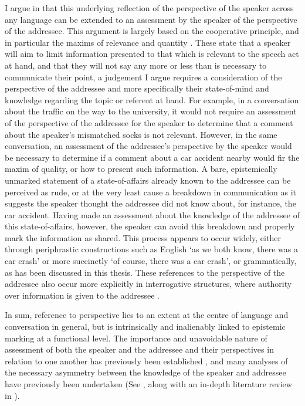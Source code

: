 I argue in  that this underlying reflection of the perspective of the speaker across any language can be extended to an assessment by the speaker of the perspective of the addressee. This argument is largely based on the cooperative principle, and in particular the maxims of relevance and quantity \cite{Grice1989}. These state that a speaker will aim to limit information presented to that which is relevant to the speech act at hand, and that they will not say any more or less than is necessary to communicate their point, a judgement I argue requires a consideration of the perspective of the addressee and more specifically their state-of-mind and knowledge regarding the topic or referent at hand. For example, in a conversation about the traffic on the way to the university, it would not require an assessment of the perspective of the addressee for the speaker to determine that a comment about the speaker's mismatched socks is not relevant. However, in the same conversation, an assessment of the addressee's perspective by the speaker would be necessary to determine if a comment about a car accident nearby would fir the maxim of quality, or how to present such information. A bare, epistemically unmarked statement of a state-of-affairs already known to the addressee can be perceived as rude, or at the very least cause a breakdown in communication as it suggests the speaker thought the addressee did not know about, for instance, the car accident. Having made an assessment about the knowledge of the addressee of this state-of-affairs, however, the speaker can avoid this breakdown and properly mark the information as shared. This process appears to occur widely, either through periphrastic constructions such as English `as we both know, there was a car crash' or more succinctly `of course, there was a car crash', or grammatically, as has been discussed in this thesis. These references to the perspective of the addressee also occur more explicitly in interrogative structures, where authority over information is given to the addressee \cite{Hill2020}.

In sum, reference to perspective lies to an extent at the centre of language and conversation in general, but is intrinsically and inalienably linked to epistemic marking at a functional level. The importance and unavoidable nature of assessment of both the speaker and the addressee and their perspectives in relation to one another has previously been established \cite{Heritage2012}, and many analyses of the necessary asymmetry between the knowledge of the speaker and addressee have previously been undertaken (See , along with an in-depth literature review in ). 
